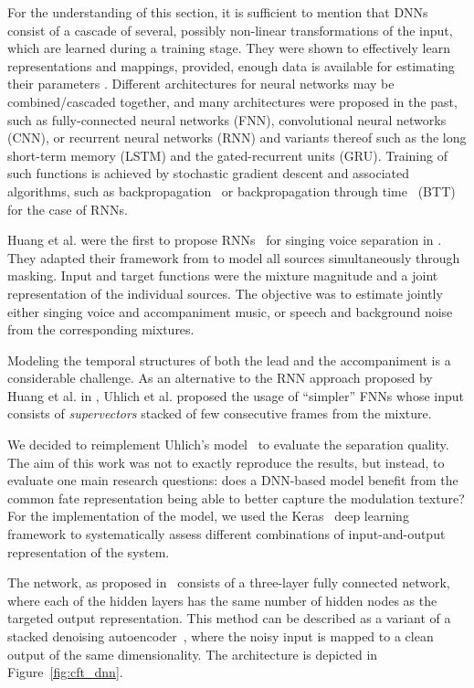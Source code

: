 For the understanding of this section, it is sufficient to mention that DNNs consist of a cascade of several, possibly non-linear transformations of the input, which are learned during a training stage.
They were shown to effectively learn representations and mappings, provided, enough data is available for estimating their parameters \cite{deng14, lecun15, goodfellow16}.
Different architectures for neural networks may be combined/cascaded together, and many architectures were proposed in the past, such as fully-connected neural networks (FNN), convolutional neural networks (CNN), or recurrent neural networks (RNN) and variants thereof such as the long short-term memory (LSTM) and the gated-recurrent units (GRU).
Training of such functions is achieved by stochastic gradient descent \cite{robbins51} and associated algorithms, such as backpropagation~\cite{rumelhart862} or backpropagation through time~\cite{rumelhart86} (BTT) for the case of RNNs.
\par
Huang et al. were the first to propose RNNs~\cite{hermans13,pascanu14} for singing voice separation in \cite{huang14,huang15}. They adapted their framework from \cite{huang142} to model all sources simultaneously through masking. Input and target functions were the mixture magnitude and a joint representation of the individual sources. The objective was to estimate jointly either singing voice and accompaniment music, or speech and background noise from the corresponding mixtures.
\par
Modeling the temporal structures of both the lead and the accompaniment is a considerable challenge. As an alternative to the RNN approach proposed by Huang et al. in \cite{huang14}, Uhlich et al. proposed the usage of ``simpler'' FNNs \cite{uhlich15} whose input consists of \textit{supervectors} stacked of few consecutive frames from the mixture.
\par
We decided to reimplement Uhlich's model~\cite{uhlich15} to evaluate the separation quality.
The aim of this work was not to exactly reproduce the results, but instead, to evaluate one main research questions: does a DNN-based model benefit from the common fate representation being able to better capture the modulation texture?
For the implementation of the model, we used the Keras~\cite{chollet15} deep learning framework to systematically assess different combinations of input-and-output representation of the system.

\par
The network, as proposed in~\cite{uhlich15} consists of a three-layer fully connected network, where each of the hidden layers has the same number of hidden nodes as the targeted output representation.
This method can be described as a variant of a stacked denoising autoencoder~\cite{pvincent08}, where the noisy input is mapped to a clean output of the same dimensionality.
The architecture is depicted in Figure~\ref{fig:cft_dnn}. 

